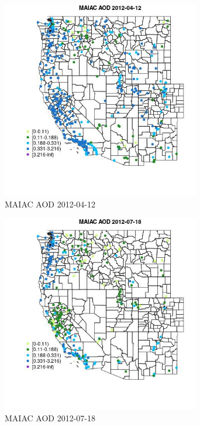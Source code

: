 \begin{figure} 
\centering  
\includegraphics[width=0.77\textwidth]{Code_Outputs/Report_ML_input_PM25_Step4_part_e_de_duplicated_aves_compiled_2019-05-14wNAs_MapObsMAIAC_AOD2012-04-12.jpg} 
\caption{\label{fig:Report_ML_input_PM25_Step4_part_e_de_duplicated_aves_compiled_2019-05-14wNAsMapObsMAIAC_AOD2012-04-12}MAIAC AOD 2012-04-12} 
\end{figure} 
 

\begin{figure} 
\centering  
\includegraphics[width=0.77\textwidth]{Code_Outputs/Report_ML_input_PM25_Step4_part_e_de_duplicated_aves_compiled_2019-05-14wNAs_MapObsMAIAC_AOD2012-07-18.jpg} 
\caption{\label{fig:Report_ML_input_PM25_Step4_part_e_de_duplicated_aves_compiled_2019-05-14wNAsMapObsMAIAC_AOD2012-07-18}MAIAC AOD 2012-07-18} 
\end{figure} 
 

